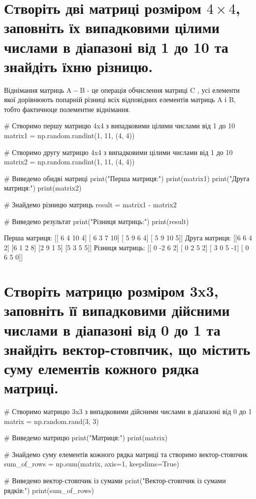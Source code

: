 \documentclass[]{article}
\newcounter{pythoncode}
\begin{document}
\section{\texorpdfstring{Створіть дві матриці розміром
		\(4\times 4\), заповніть їх випадковими цілими числами в діапазоні від 1
		до 10 та знайдіть їхню
		різницю.}{Створіть дві матриці розміром 4\textbackslash times 4, заповніть їх випадковими цілими числами в діапазоні від 1 до 10 та знайдіть їхню різницю.}}

Віднімання матриць \(\mathrm A - \mathrm B\) - це операція обчислення
матриці \(\mathrm C\) , усі елементи якої дорівнюють попарній різниці
всіх відповідних елементів матриць \(\mathrm A\) і \(\mathrm B\), тобто
фактичноце полементне віднімання.

\begin{pythoncode}
    # Створимо першу матрицю 4x4 з випадковими цілими числами від 1 до 10
    matrix1 = np.random.randint(1, 11, (4, 4))

    # Створимо другу матрицю 4x4 з випадковими цілими числами від 1 до 10
    matrix2 = np.random.randint(1, 11, (4, 4))

    # Виведемо обидві матриці
    print("Перша матриця:")
    print(matrix1)
    print("Друга матриця:")
    print(matrix2)

    # Знайдемо різницю матриць
    result = matrix1 - matrix2

    # Виведемо результат
    print("Різниця матриць:")
    print(result)
\end{pythoncode}

\begin{out}
	Перша матриця:
	[[ 6  4 10  4]
	 [ 6  3  7 10]
	 [ 5  9  6  4]
	 [ 5  9 10  5]]
	Друга матриця:
	[[6 6 4 2]
	 [6 1 2 8]
	 [2 9 1 5]
	 [5 3 5 5]]
	Різниця матриць:
	[[ 0 -2  6  2]
	 [ 0  2  5  2]
	 [ 3  0  5 -1]
	 [ 0  6  5  0]]
\end{out}

\section{Створіть матрицю розміром 3x3, заповніть її випадковими дійсними числами в діапазоні від 0 до 1 та знайдіть вектор-стовпчик, що містить суму елементів кожного рядка матриці.}

\begin{pythoncode}
    # Створимо матрицю 3x3 з випадковими дійсними числами в діапазоні від 0 до 1
    matrix = np.random.rand(3, 3)

    # Виведемо матрицю
    print("Матриця:")
    print(matrix)

    # Знайдемо суму елементів кожного рядка матриці та створимо вектор-стовпчик
    sum_of_rows = np.sum(matrix, axis=1, keepdims=True)

    # Виведемо вектор-стовпчик із сумами
    print("Вектор-стовпчик із сумами рядків:")
    print(sum_of_rows)
\end{pythoncode}
\end{document}
